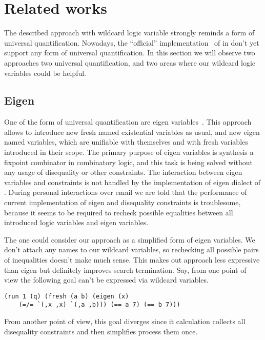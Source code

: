 

\section{Related works}
\label{sec:related}

The described approach with wildcard logic variable
strongly reminds a form of universal quantification.
Nowadays, the ``official'' implementation~\cite{fasterMK} of \miniKanren{} in \Scheme{} don't yet support any form of universal quantification. In this section we will observe two approaches two universal quantification, and two areas where our wildcard logic variables could be helpful.

\subsection{Eigen}

One of the form of universal quantification are eigen variables~\cite{eigen}. This approach allows to introduce new fresh named existential variables as usual, and new eigen named variables, which are unifiable with themselves and with fresh variables introduced in their scope. The primary purpose of eigen variables is synthesis a fixpoint combinator in combinatory logic, and this task is being solved without any usage of disequality or other constraints. The interaction between eigen variables and constraints is not handled by the implementation of eigen dialect of \miniKanren{}. During personal interactions over email we are told that the performance of current implementation of eigen and disequality constraints is troublesome, because it seems to be required to recheck possible equalities between all introduced logic variables and eigen variables.

The one could consider our approach as a simplified form of eigen variables.
We don't attach any names to our wildcard variables, so rechecking all possible pairs of inequalities doesn't make much sense.
This makes out approach less expressive than eigen but definitely improves search termination.
Say, from one point of view the following goal can't be expressed via wildcard variables.
\begin{lstlisting}[language=ocanren]
(run 1 (q) (fresh (a b) (eigen (x)
    (=/= `(,x ,x) `(,a ,b))) (== a 7) (== b 7)))
\end{lstlisting}
From another point of view, this goal diverges since it calculation collects all disequality constraints and then simplifies process them once.

